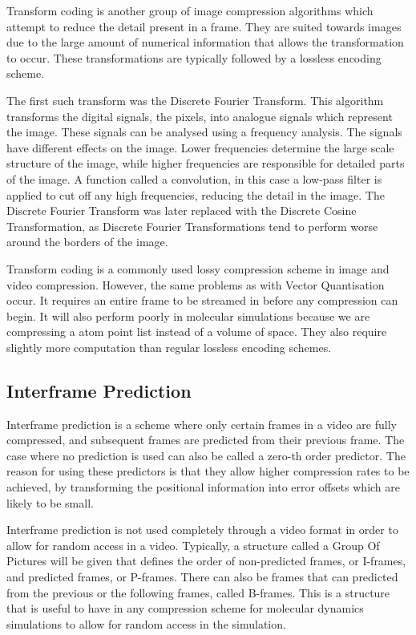 \documentclass[twocolumn, a4paper,10pt]{article}
\begin{document}
Transform coding is another group of image compression algorithms which attempt to reduce the detail present in a frame. They are suited towards images due to the large amount of numerical information that allows the transformation to occur. These transformations are typically followed by a lossless encoding scheme.

The first such transform was the Discrete Fourier Transform\cite{Cody92thefast}. This algorithm transforms the digital signals, the pixels, into analogue signals which represent the image. These signals can be analysed using a frequency analysis. The signals have different effects on the image. Lower frequencies determine the large scale structure of the image, while higher frequencies are responsible for detailed parts of the image. A function called a convolution, in this case a low-pass filter is applied to cut off any high frequencies, reducing the detail in the image.\cite{1464352} The Discrete Fourier Transform was later replaced with the Discrete Cosine Transformation, as Discrete Fourier Transformations tend to perform worse around the borders of the image\cite{RefWorks:1}.

Transform coding is a commonly used lossy compression scheme in image and video compression. However, the same problems as with Vector Quantisation occur. It requires an entire frame to be streamed in before any compression can begin. It will also perform poorly in molecular simulations because we are compressing a atom point list instead of a volume of space. They also require slightly more computation than regular lossless encoding schemes.

\subsection*{Interframe Prediction}

Interframe prediction is a scheme where only certain frames in a video are fully compressed, and subsequent frames are predicted from their previous frame. The case where no prediction is used can also be called a zero-th order predictor. The reason for using these predictors is that they allow higher compression rates to be achieved, by transforming the positional information into error offsets which are likely to be small. 

Interframe prediction is not used completely through a video format in order to allow for random access in a video. Typically, a structure called a Group Of Pictures will be given that defines the order of non-predicted frames, or I-frames, and predicted frames, or P-frames\cite{vandalore2001sal}. There can also be frames that can predicted from the previous or the following frames, called B-frames. This is a structure that is useful to have in any compression scheme for molecular dynamics simulations to allow for random access in the simulation.
\end{document}
